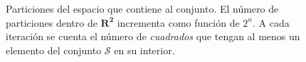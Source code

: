 \documentclass[letterpaper,12pt,oneside]{book}
\begin{document}
\begin{figure}[h!]
\begin{minipage}{.45\linewidth}
\centering
{}
\end{minipage}%
\begin{minipage}{.45\linewidth}
\centering
{}
\end{minipage}

\caption{Particiones del espacio que contiene al conjunto. El número de particiones dentro de $\mathbf{R^{2}}$ incrementa como función de $2^{n}$. A cada iteración se cuenta el número de \textit{cuadrados} que tengan al menos un elemento del conjunto $\mathcal{S}$ en su interior.}
\label{fig:box-count}
\end{figure}
\\
\end{document}
